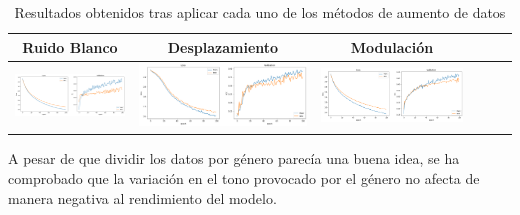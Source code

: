 \documentclass[11pt,a4paper,spanish]{book}
\begin{document}
			\begin{table}[H]
			\centering
			\begin{center}
				\begin{tabular}{| c | c | c | c | c | c |}
					\hline
					Ruido Blanco & Desplazamiento & Modulación \\ 
					\hline
					 \includegraphics[scale=0.15]{results/white_noise1.png} & \includegraphics[scale=0.15]{results/shiftting_1.png} & \includegraphics[scale=0.15]{results/pitch.png}\\
					
					\hline	
				\end{tabular}
				\caption{Resultados obtenidos tras aplicar cada uno de los métodos de aumento de datos}
				\label{tab:augmentationData_1}
			\end{center}
		\end{table}
	
		A pesar de que dividir los datos por género parecía una buena idea, se ha comprobado que la variación en el tono provocado por el género no afecta de manera negativa al rendimiento del modelo.
		
\end{document}
